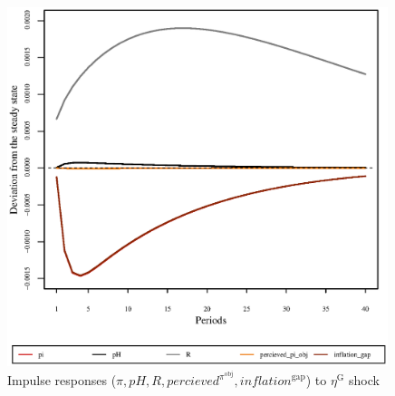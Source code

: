 \pagebreak

\begin{figure}[h]
\centering
\begin{minipage}{0.5\textwidth}
\vspace*{-3em}
\centering
\includegraphics[width=0.99\textwidth, scale=0.55]{plots/plot_75.eps}
\caption{Impulse responses ($\pi, {p\!H}, R, {p\!e\!r\!c\!i\!e\!v\!e\!d}^{\pi^{\mathrm{obj}}}, {i\!n\!f\!l\!a\!t\!i\!o\!n}^{\mathrm{gap}}$) to $\eta^{\mathrm{G}}$ shock}
\end{minipage}
\end{figure}
